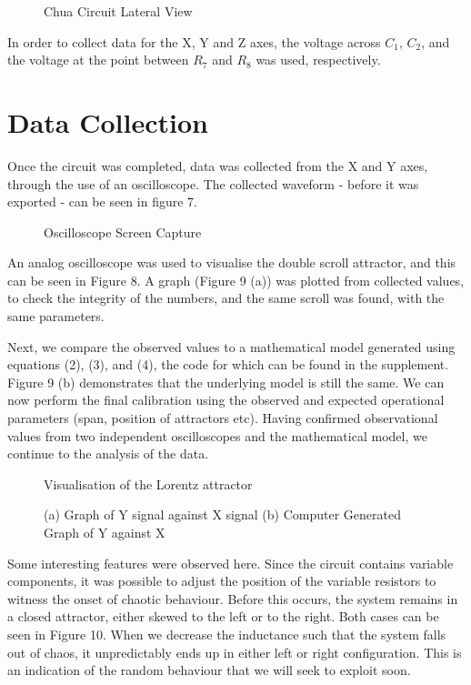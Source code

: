 \documentclass[jou,apacite]{apa6}
\begin{document}
\begin{figure}[H]
\caption{Chua Circuit Lateral View}
\end{figure}

In order to collect data for the X, Y and Z axes, the voltage across $C_1$, $C_2$, and the voltage at the point between $R_7$ and $R_8$ was used, respectively.

\section{Data Collection}

Once the circuit was completed, data was collected from the X and Y axes, through the use of an oscilloscope. The collected waveform - before it was exported - can be seen in figure 7.  

\begin{figure}[H]
\caption{Oscilloscope Screen Capture}
\end{figure}

An analog oscilloscope was used to visualise the double scroll attractor, and this can be seen in Figure 8. A graph (Figure 9 (a)) was plotted from collected values, to check the integrity of the numbers, and the same scroll was found, with the same parameters. 

Next, we compare the observed values to a mathematical model generated using equations (2), (3), and (4), the code for which can be found in the supplement. Figure 9 (b) demonstrates that the underlying model is still the same. We can now perform the final calibration using the observed and expected operational parameters (span, position of attractors etc).
Having confirmed observational values from two independent oscilloscopes and the mathematical model, we continue to the analysis of the data.

\begin{figure}[H]
\caption{Visualisation of the Lorentz attractor}
\end{figure}

\begin{figure}[H]
\caption{(a) Graph of Y signal against X signal (b) Computer Generated Graph of Y against X}
\endminipage\hfill
{}
\endminipage
\end{figure}

Some interesting features were observed here. Since the circuit contains variable components, it was possible to adjust the position of the variable resistors to witness the onset of chaotic behaviour. Before this occurs, the system remains in a closed attractor, either skewed to the left or to the right. Both cases can be seen in Figure 10. When we decrease the inductance such that the system falls out of chaos, it unpredictably ends up in either left or right configuration. This is an indication of the random behaviour that we will seek to exploit soon.
\end{document}
